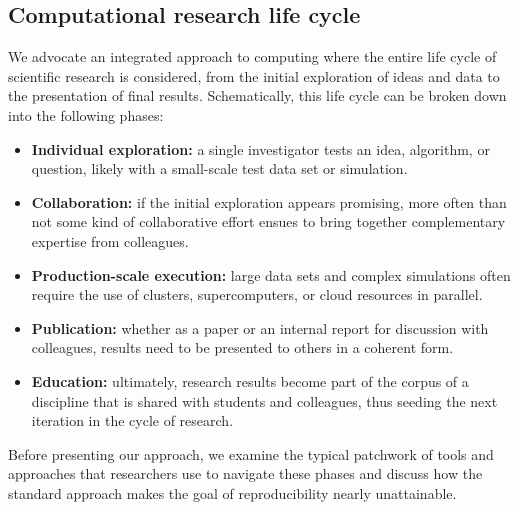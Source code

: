 \documentclass[11pt,oneside,english]{article}
\begin{document}
\subsection{Computational research life cycle}\label{subsec:lifecycle}

We advocate an integrated approach to computing where the entire
life cycle of scientific research is considered, from the initial exploration
of ideas and data to the presentation of final results.  Schematically, this
life cycle can be broken down into the following phases:

\begin{itemize}
\item \textbf{Individual exploration:} a single investigator tests an idea,
  algorithm, or question, likely with a small-scale test data set or simulation.
\item \textbf{Collaboration:} if the initial exploration appears promising,
  more often than not some kind of collaborative effort ensues to bring
  together complementary expertise from colleagues.
\item \textbf{Production-scale execution:} large data sets and complex
  simulations often require the use of clusters, supercomputers, or cloud
  resources in parallel.
\item \textbf{Publication:} whether as a paper or an internal report for
  discussion with colleagues, results need to be presented to others in a
  coherent form.
\item \textbf{Education:} ultimately, research results become part of the
  corpus of a discipline that is shared with students and colleagues, thus
  seeding the next iteration in the cycle of research.
\end{itemize}
Before presenting our approach, we examine the typical patchwork of tools and
approaches that researchers use to navigate these phases and discuss how the
standard approach makes the goal of reproducibility nearly unattainable.
\end{document}
